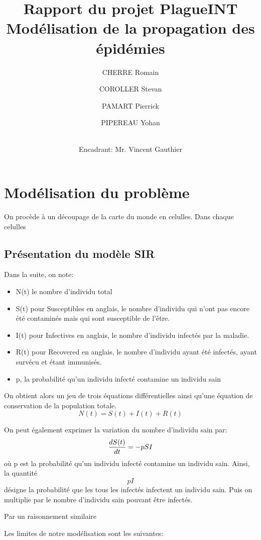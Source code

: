 \documentclass[12pt,a4paper]{report}
\title{ \Huge \textbf{Rapport du projet PlagueINT} \\ \large Modélisation de la propagation des épidémies}
\author{
CHERRE Romain
\and COROLLER Stevan 
\and PAMART Pierrick
\and PIPEREAU Yohan
\and \\
Encadrant: Mr. Vincent Gauthier }
\begin{document}
\maketitle

\tableofcontents

\newpage

\section*{Modélisation du problème}
\begin{flushleft}
	On procède à un découpage de la carte du monde en celulles. Dans chaque celulles 
\end{flushleft}

\subsection*{Présentation du modèle SIR}

\begin{flushleft}
	Dans la suite, on note:
\begin{itemize}
	\item{N(t) le nombre d'individu total}
	\item{S(t) pour Susceptibles en anglais, le nombre d'individu qui n'ont pas encore été contaminés mais qui sont susceptible de l'être.}
	\item{I(t) pour Infectives en anglais, le nombre d'individu infectés par la maladie.}
	\item{R(t) pour Recovered en anglais, le nombre d'individu ayant été infectés, ayant survécu et étant immunisés.}
	\item{p, la probabilité qu'un individu infecté contamine un individu sain}
\end{itemize}
\end{flushleft}

\begin{flushleft}
	On obtient alors un jeu de trois équations différentielles ainsi qu'une équation de conservation de la population totale.
$$ N(t)=S(t)+I(t)+R(t) $$

	On peut également exprimer la variation du nombre d'individu sain par: $$ {dS(t) \over dt} = -p S I $$
où p est la probabilité qu'un individu infecté contamine un individu sain.
Ainsi, la quantité $$ pI $$ désigne la probabilité que les tous les infectés infectent un individu sain. Puis on multiplie par le nombre d'individu sain pouvant être infectés.

Par un raisonnement similaire 

\end{flushleft}

\begin{flushleft}
Les limites de notre modélisation sont les suivantes:
\end{flushleft}
\end{document}
